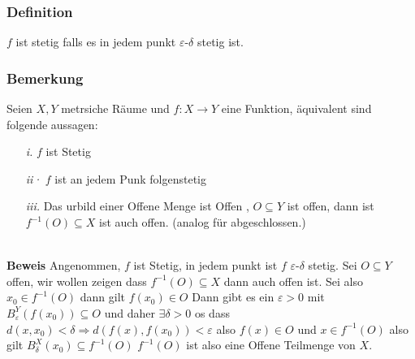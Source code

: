 \documentclass{article}
\newcommand{\beweis}{\\\textbf{Beweis }}
\newcommand{\bemerkung}[1]{\subsubsection*{Bemerkung {#1}}}
\newcommand{\definition}[1]{\subsubsection*{Definition {#1}}}
\begin{document}
\definition{} $f$ ist stetig falls es in jedem punkt $\varepsilon$-$\delta$ stetig ist.
\bemerkung{} Seien $X,Y$ metrsiche Räume und $f:X\rightarrow Y$ eine Funktion, äquivalent sind folgende aussagen:
\begin{itemize}
  \item[\textit{i.}]{ $f$ ist Stetig}
  \item[\textit{ii·}]{$f$ ist an jedem Punk folgenstetig}
  \item[\textit{iii.}]{Das urbild einer Offene Menge ist Offen , $O\subseteq Y$ ist offen, dann ist $f^{-1}(O)\subseteq X$ ist auch offen. (analog für abgeschlossen.)}
\end{itemize}
\beweis Angenommen, $f$ ist Stetig, in jedem punkt ist $f$ $\varepsilon$-$\delta$ stetig. Sei $O\subseteq Y$ offen, wir wollen zeigen dass $f^{-1}(O)\subseteq X$ dann auch offen ist. Sei also $x_0\in f^{-1}(O)$ dann gilt $f(x_0)\in O$ Dann gibt es ein $\varepsilon > 0$ mit $B_\varepsilon^Y(f(x_0))\subseteq O$ und daher $\exists \delta>0$ os dass $d(x,x_0)<\delta\Longrightarrow d(f(x),f(x_0))<\varepsilon$ also $f(x)\in O$ und $x\in f^{-1}(O)$ also gilt $B_\delta^X(x_0)\subseteq f^{-1}(O)$
$f^{-1}(O)$ ist also eine Offene Teilmenge von $X$.
\end{document}
